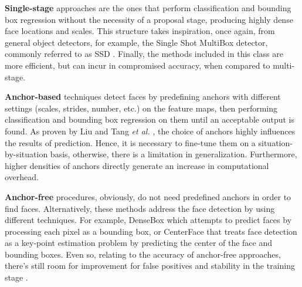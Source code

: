 \documentclass[class=report, crop=false, a4paper, 12pt]{standalone}
\begin{document}
\vspace{\baselineskip}
\par \noindent \textbf{Single-stage} approaches \autocite{dengRetinaFaceSinglestageDense2019} are the ones that perform classification and bounding box regression without the necessity of a proposal stage, producing highly dense face locations and scales. This structure takes inspiration, once again, from general object detectors, for example, the Single Shot MultiBox detector, commonly referred to as SSD \autocite{liuSSDSingleShot2016}. Finally, the methods included in this class are more efficient, but can incur in compromised accuracy, when compared to multi-stage.

\vspace{\baselineskip}
\par \noindent \textbf{Anchor-based} techniques \autocite{liuHAMBoxDelvingOnline2019, dengRetinaFaceSinglestageDense2019, zhangFaceDetectionUsing2018} detect faces by predefining anchors with different settings (scales, strides, number, etc.) on the feature maps, then performing classification and bounding box regression on them until an acceptable output is found. As proven by Liu and Tang \textit{et al.} \autocite{liuHAMBoxDelvingOnline2019}, the choice of anchors highly influences the results of prediction. Hence, it is necessary to fine-tune them on a situation-by-situation basis, otherwise, there is a limitation in generalization. Furthermore, higher densities of anchors directly generate an increase in computational overhead.

\vspace{\baselineskip}
\par \noindent \textbf{Anchor-free} procedures, obviously, do not need predefined anchors in order to find faces. Alternatively, these methods address the face detection by using different techniques. For example, DenseBox \autocite{huangDenseBoxUnifyingLandmark2015} which attempts to predict faces by processing each pixel as a bounding box, or CenterFace \autocite{xuCenterFaceJointFace2019} that treats face detection as a key-point estimation problem by predicting the center of the face and bounding boxes. Even so, relating to the accuracy of anchor-free approaches, there's still room for improvement for false positives and stability in the training stage \autocite{duElementsEndtoendDeep2022}.
\end{document}
